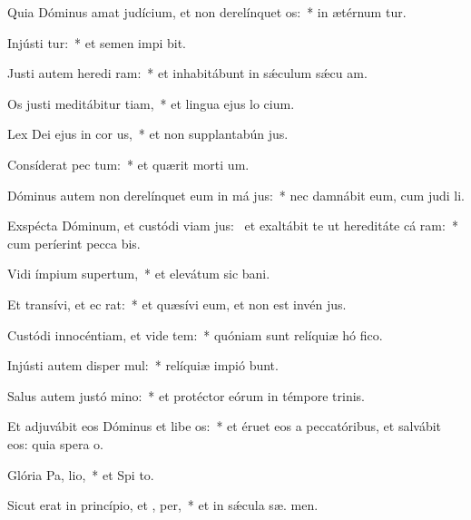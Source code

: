 \item Quia Dóminus amat judícium, et non derelínquet  os:~* in ætérnum tur.
\item Injústi tur:~* et semen impi bit.
\item Justi autem heredi ram:~* et inhabitábunt in sǽculum sǽcu  am.
\item Os justi meditábitur tiam,~* et lingua ejus lo cium.
\item Lex Dei ejus in cor us,~* et non supplantabún  jus.
\item Consíderat pec tum:~* et quærit morti um.
\item Dóminus autem non derelínquet eum in má jus:~* nec damnábit eum, cum judi li.
\item Exspécta Dóminum, et custódi viam jus:~\pscross{} et exaltábit te ut hereditáte cá ram:~* cum períerint pecca bis.
\item Vidi ímpium supertum,~* et elevátum sic  bani.
\item Et transívi, et ec  rat:~* et quæsívi eum, et non est invén  jus.
\item Custódi innocéntiam, et vide tem:~* quóniam sunt relíquiæ hó fico.
\item Injústi autem disper mul:~* relíquiæ impió bunt.
\item Salus autem justó  mino:~* et protéctor eórum in témpore trinis.
\item Et adjuvábit eos Dóminus et libe os:~* et éruet eos a peccatóribus, et salvábit eos: quia spera  o.
\item Glória Pa,  lio,~* et Spi to.
\item Sicut erat in princípio, et ,  per,~* et in sǽcula sæ. men.
